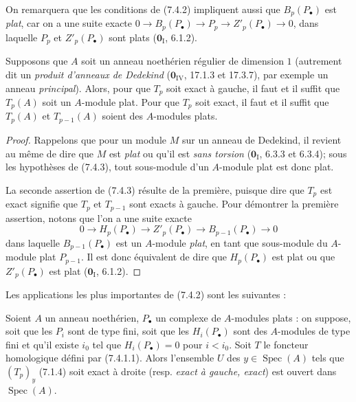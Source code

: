 On remarquera que les conditions de (7.4.2) impliquent aussi que
$B_p(P_\bullet)$ est \emph{plat}, car on a une suite exacte
$0\longrightarrow B_p(P_\bullet)\longrightarrow P_p
\longrightarrow Z'_p(P_\bullet)\longrightarrow0$,
dans laquelle $P_p$ et $Z'_p(P_\bullet)$ sont plats ($\mathbf{0}_{\mathrm I}$, 6.1.2).

\begin{corollary}[7.4.3]
Supposons que $A$ soit un anneau noethérien régulier de dimension $1$
\textup{(autrement dit un \emph{produit d'anneaux de Dedekind}
($\mathbf{0}_{\mathrm{IV}}$, 17.1.3 et 17.3.7), par exemple un anneau \emph{principal})}. Alors,
pour que $T_p$ soit exact à gauche, il faut et il suffit que $T_p(A)$ soit un
$A$-module plat. Pour que $T_p$ soit exact, il faut et il suffit que $T_p(A)$
et $T_{p-1}(A)$ soient des $A$-modules plats.
\end{corollary}

\begin{proof}
Rappelons que pour un module $M$ sur un anneau de Dedekind, il revient au même
de dire que $M$ est \emph{plat} ou qu'il est \emph{sans torsion} ($\mathbf{0}_{\mathrm I}$, 6.3.3 et
6.3.4); sous les hypothèses de (7.4.3), tout sous-module d'un $A$-module plat
est donc plat.

La seconde assertion de (7.4.3) résulte de la première, puisque dire que $T_p$
est exact signifie que $T_p$ et $T_{p-1}$ sont exacts à gauche. Pour démontrer
la première assertion, notons que l'on a une suite exacte
\[
  0\longrightarrow H_p(P_\bullet)\longrightarrow Z'_p(P_\bullet)
  \longrightarrow B_{p-1}(P_\bullet)\longrightarrow0
\]
dans laquelle $B_{p-1}(P_\bullet)$ est un $A$-module \emph{plat}, en tant que
sous-module du $A$-module plat $P_{p-1}$. Il est donc équivalent de dire que
$H_p(P_\bullet)$ est plat ou que $Z'_p(P_\bullet)$ est plat
($\mathbf{0}_{\mathrm I}$, 6.1.2).
\end{proof}

Les applications les plus importantes de (7.4.2) sont les suivantes :

\begin{proposition}[7.4.4]
Soient $A$ un anneau noethérien, $P_\bullet$ un complexe de $A$-modules plats :
on suppose, soit que les $P_i$ sont de type fini, soit que les
$H_i(P_\bullet)$ sont des $A$-modules de type fini et qu'il existe $i_0$ tel
que $H_i(P_\bullet)=0$ pour $i<i_0$. Soit $T$ le foncteur homologique défini
par \textup{(7.4.1.1)}. Alors l'ensemble $U$ des
$y\in\operatorname{Spec}(A)$ tels que $(T_p)_y$ \textup{(7.1.4)} soit exact à droite
\textup{(resp. \emph{exact à gauche, exact})} est ouvert dans $\operatorname{Spec}(A)$.
\end{proposition}

